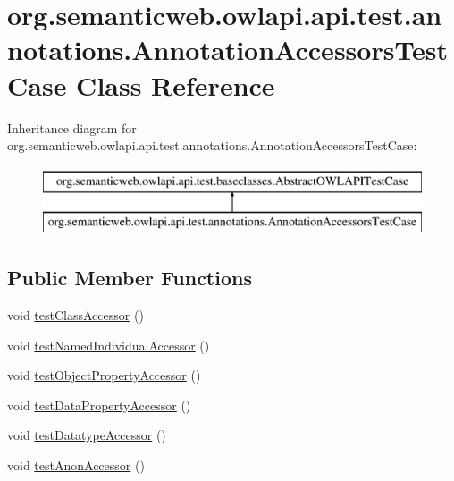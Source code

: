 \hypertarget{classorg_1_1semanticweb_1_1owlapi_1_1api_1_1test_1_1annotations_1_1_annotation_accessors_test_case}{\section{org.\-semanticweb.\-owlapi.\-api.\-test.\-annotations.\-Annotation\-Accessors\-Test\-Case Class Reference}
\label{classorg_1_1semanticweb_1_1owlapi_1_1api_1_1test_1_1annotations_1_1_annotation_accessors_test_case}
}
Inheritance diagram for org.\-semanticweb.\-owlapi.\-api.\-test.\-annotations.\-Annotation\-Accessors\-Test\-Case\-:\begin{figure}[H]
\begin{center}
\leavevmode
\includegraphics[height=2.000000cm]{classorg_1_1semanticweb_1_1owlapi_1_1api_1_1test_1_1annotations_1_1_annotation_accessors_test_case}
\end{center}
\end{figure}
\subsection*{Public Member Functions}
\begin{DoxyCompactItemize}
\item 
void \hyperlink{classorg_1_1semanticweb_1_1owlapi_1_1api_1_1test_1_1annotations_1_1_annotation_accessors_test_case_a2836e51c99d582ac4a1fbb69370337fa}{test\-Class\-Accessor} ()
\item 
void \hyperlink{classorg_1_1semanticweb_1_1owlapi_1_1api_1_1test_1_1annotations_1_1_annotation_accessors_test_case_a11f01a688eb4b9f1f60e42069a0e3424}{test\-Named\-Individual\-Accessor} ()
\item 
void \hyperlink{classorg_1_1semanticweb_1_1owlapi_1_1api_1_1test_1_1annotations_1_1_annotation_accessors_test_case_aab6d7b121cbb1ef9f5e5812264c6bd82}{test\-Object\-Property\-Accessor} ()
\item 
void \hyperlink{classorg_1_1semanticweb_1_1owlapi_1_1api_1_1test_1_1annotations_1_1_annotation_accessors_test_case_ac433b237d2ae7c562711eee0e633d46c}{test\-Data\-Property\-Accessor} ()
\item 
void \hyperlink{classorg_1_1semanticweb_1_1owlapi_1_1api_1_1test_1_1annotations_1_1_annotation_accessors_test_case_a8b6d38127891e4f7eea4101489fa3daf}{test\-Datatype\-Accessor} ()
\item 
void \hyperlink{classorg_1_1semanticweb_1_1owlapi_1_1api_1_1test_1_1annotations_1_1_annotation_accessors_test_case_a90706c2b8f28e7cb34792dbc38999bd1}{test\-Anon\-Accessor} ()
\end{DoxyCompactItemize}
